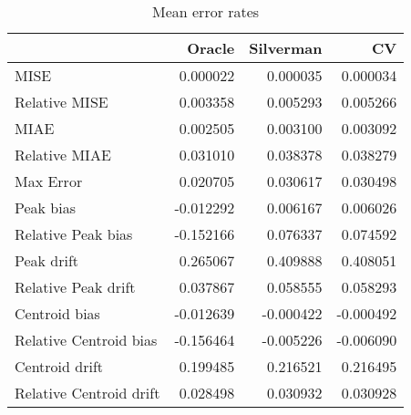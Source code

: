 \begin{table}[ht]
\centering
\begin{tabular}{lrrr}
  \hline
 & Oracle & Silverman & CV \\ 
  \hline
MISE & 0.000022 & 0.000035 & 0.000034 \\ 
  Relative MISE & 0.003358 & 0.005293 & 0.005266 \\ 
  MIAE & 0.002505 & 0.003100 & 0.003092 \\ 
  Relative MIAE & 0.031010 & 0.038378 & 0.038279 \\ 
  Max Error & 0.020705 & 0.030617 & 0.030498 \\ 
  Peak bias & -0.012292 & 0.006167 & 0.006026 \\ 
  Relative Peak bias & -0.152166 & 0.076337 & 0.074592 \\ 
  Peak drift & 0.265067 & 0.409888 & 0.408051 \\ 
  Relative Peak drift & 0.037867 & 0.058555 & 0.058293 \\ 
  Centroid bias & -0.012639 & -0.000422 & -0.000492 \\ 
  Relative Centroid bias & -0.156464 & -0.005226 & -0.006090 \\ 
  Centroid drift & 0.199485 & 0.216521 & 0.216495 \\ 
  Relative Centroid drift & 0.028498 & 0.030932 & 0.030928 \\ 
   \hline
\end{tabular}
\caption{Mean error rates} 
\label{tbl:mean_error_rates}
\end{table}
